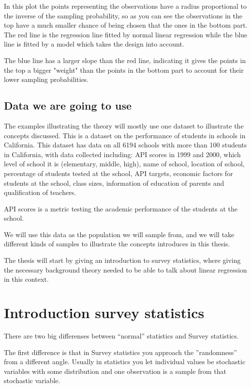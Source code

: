 \documentclass{article}
\begin{document}
\begin{example}
In this plot the points representing the observations have a radius proportional to the inverse of the sampling probability, so as you can see the observations in the top have a much smaller chance of being chosen that the ones in the bottom part. The red line is the regression line fitted by normal linear regression while the blue line is fitted by a model which takes the design into account. 

The blue line has a larger slope than the red line, indicating it gives the points in the top a bigger "weight" than the points in the bottom part to account for their lower sampling probabilities.

\end{example}

\subsection{Data we are going to use}

The examples illustrating the theory will mostly use one dataset to illustrate the concepts
discussed. This is a dataset on the performance of students in schools in
California. This dataset has data on all 6194 schools with more than 100
students in California, with data collected
including: API scores in 1999 and 2000, which level of school it is
(elementary, middle, high), name of school, location of school, percentage of
students tested at the school, API targets, economic factors for students at the
school, class sizes, information of education of parents and qualification of teachers.

API scores is a metric testing the academic performance of the students at the school.

We will use this data as the population we will sample from, and we will take
different kinds of samples to illustrate the concepts introduces in this thesis.

The thesis will start by giving an introduction to survey statistics, where giving the necessary background theory needed to be able to talk about linear regression in this context.

\section{Introduction survey statistics}

There are two big differenses between ``normal'' statistics and Survey statistics.

The first difference is that in Survey statistics you approach the ''randomness'' from a different angle.
Usually in statistics you let individual values be stochastic variables
with some distribution and one observation is a sample from that stochastic
variable.
\end{document}
